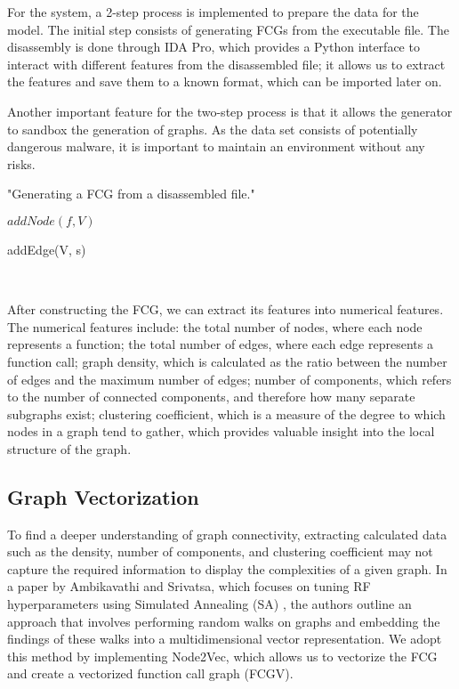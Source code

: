 \documentclass[11pt]{article}
\begin{document}
For the system, a 2-step process is implemented to prepare the data for the model. The initial step consists of generating FCGs from the executable file. The disassembly is done through IDA Pro, which provides a Python interface to interact with different features from the disassembled file; it allows us to extract the features and save them to a known format, which can be imported later on. 

Another important feature for the two-step process is that it allows the generator to sandbox the generation of graphs. As the data set consists of potentially dangerous malware, it is important to maintain an environment without any risks. 

\begin{algorithm}
    \caption{"Generating a FCG from a disassembled file."}
    \label{alg:generate_fcg_alg}
    \begin{algorithmic}
    \;
    \;
        \State $addNode(f, V)$\;

            \State addEdge(V, s)\;
        \EndFor
    
    \EndFor \\
    \EndFunction
    \end{algorithmic}
\end{algorithm}
After constructing the FCG, we can extract its features into numerical features. The numerical features include: the total number of nodes, where each node represents a function; the total number of edges, where each edge represents a function call; graph density, which is calculated as the ratio between the number of edges and the maximum number of edges; number of components, which refers to the number of connected components, and therefore how many separate subgraphs exist; clustering coefficient, which is a measure of the degree to which nodes in a graph tend to gather, which provides valuable insight into the local structure of the graph.

\subsection{Graph Vectorization}

To find a deeper understanding of graph connectivity, extracting calculated data such as the density, number of components, and clustering coefficient may not capture the required information to display the complexities of a given graph. In a paper by Ambikavathi and Srivatsa, which focuses on tuning RF hyperparameters using Simulated Annealing (SA) \cite{simanneal}, the authors outline an approach that involves performing random walks on graphs and embedding the findings of these walks into a multidimensional vector representation. We adopt this method by implementing Node2Vec, which allows us to vectorize the FCG and create a vectorized function call graph (FCGV).
\end{document}
